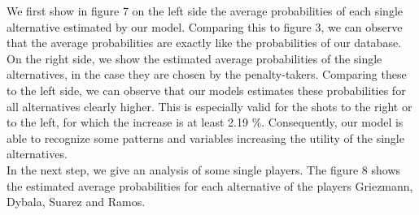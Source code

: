 \documentclass[12pt,dvipsnames]{article}%
\begin{document}
We first show in figure 7 on the left side the average probabilities of each single alternative estimated by our model. Comparing this to figure 3, we can observe that the average probabilities are exactly like the probabilities of our database. On the right side, we show the estimated average probabilities of the single alternatives, in the case they are chosen by the penalty-takers. Comparing these to the left side, we can observe that our models estimates these probabilities for all alternatives clearly higher. This is especially valid for the shots to the right or to the left, for which the increase is at least 2.19 \%. Consequently, our model is able to recognize some patterns and variables increasing the utility of the single alternatives.  \\
In the next step, we give an analysis of some single players. The figure 8 shows the estimated average probabilities for each alternative of the players Griezmann, Dybala, Suarez and Ramos.
\\
\end{document}
